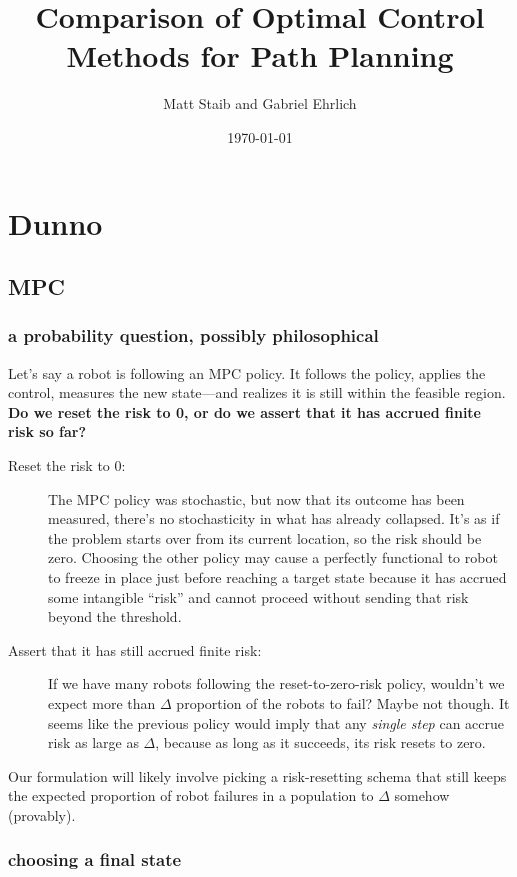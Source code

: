 \documentclass[11pt]{article}
\title{Comparison of Optimal Control Methods for Path Planning}
\author{Matt Staib and Gabriel Ehrlich}
\date{\today}
\begin{document}
\maketitle

\section{Dunno}

\subsection{MPC}

\subsubsection{a probability question, possibly philosophical}

Let's say a robot is following an MPC policy. It follows the policy, applies the control, measures the new state---and realizes it is still within the feasible region. {\bf Do we reset the risk to 0, or do we assert that it has accrued finite risk so far?}

\begin{description}
\item[Reset the risk to 0:] The MPC policy was stochastic, but now that its outcome has been measured, there's no stochasticity in what has already collapsed. It's as if the problem starts over from its current location, so the risk should be zero. Choosing the other policy may cause a perfectly functional to robot to freeze in place just before reaching a target state because it has accrued some intangible ``risk'' and cannot proceed without sending that risk beyond the threshold.
\item[Assert that it has still accrued finite risk:] If we have many robots following the reset-to-zero-risk policy, wouldn't we expect more than \(\Delta\) proportion of the robots to fail? Maybe not though. It seems like the previous policy would imply that any \emph{single step} can accrue risk as large as \(\Delta\), because as long as it succeeds, its risk resets to zero.
\end{description}

Our formulation will likely involve picking a risk-resetting schema that still keeps the expected proportion of robot failures in a population to \(\Delta\) somehow (provably).

\subsubsection{choosing a final state}
\end{document}
